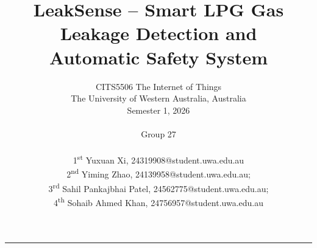 \documentclass[a4paper,10pt,conference,onecolumn]{IEEEtran}
\begin{document}
\title{LeakSense -- Smart LPG Gas Leakage Detection and\\Automatic Safety System}

\author{
  CITS5506 The Internet of Things\\
The University of Western Australia, Australia\\
Semester 1, 2026\\

\\

Group 27
\\
\\
  1\textsuperscript{st} Yuxuan Xi, 24319908@student.uwa.edu.au\\
  2\textsuperscript{nd} Yiming Zhao, 24139958@student.uwa.edu.au;\\
  3\textsuperscript{rd} Sahil Pankajbhai Patel, 24562775@student.uwa.edu.au;\\
  4\textsuperscript{th} Sohaib Ahmed Khan, 24756957@student.uwa.edu.au\\
}

\maketitle
\noindent\rule{\linewidth}{0.4pt}
\vspace{0.6em}
\end{document}
